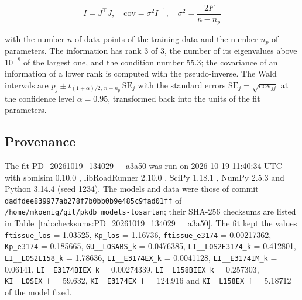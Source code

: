 \documentclass{article}
\begin{document}
\begin{equation}
I = J^\top J, \quad \mathrm{cov} = \sigma^2 I^{-1}, \quad \sigma^2 = \frac{2 F}{n - n_p}
\end{equation}

with the number $n$ of data points of the training data and the number $n_p$ of parameters. The information has rank 3 of 3, the number of its eigenvalues above $10^{-8}$ of the largest one, and the condition number 55.3; the covariance of an information of a lower rank is computed with the pseudo-inverse. The Wald intervals are $\hat{p}_j \pm t_{(1+\alpha)/2,\, n-n_p}\, \mathrm{SE}_j$ with the standard errors $\mathrm{SE}_j = \sqrt{\mathrm{cov}_{jj}}$ at the confidence level $\alpha = 0.95$, transformed back into the units of the fit parameters.

\subsection{Provenance}

The fit PD\_20261019\_134029\_\_a3a50 was run on 2026-10-19 11:40:34 UTC with sbmlsim 0.10.0 \cite{Koenig2026_sbmlsim}, libRoadRunner 2.10.0 \cite{Welsh2023}, SciPy 1.18.1 \cite{Virtanen2020}, NumPy 2.5.3 \cite{Harris2020} and Python 3.14.4 (seed 1234). The models and data were those of commit \texttt{dadfdee839977ab278f7b0bb0b9e485c9fad01ff} of \texttt{/home/mkoenig/git/pkdb\_models-losartan}; their SHA-256 checksums are listed in Table~\ref{tab:checksums:PD_20261019_134029__a3a50}. The fit kept the values \texttt{ftissue\_los} = 1.03525, \texttt{Kp\_los} = 1.16736, \texttt{ftissue\_e3174} = 0.00217362, \texttt{Kp\_e3174} = 0.185665, \texttt{GU\_\_LOSABS\_k} = 0.0476385, \texttt{LI\_\_LOS2E3174\_k} = 0.412801, \texttt{LI\_\_LOS2L158\_k} = 1.78636, \texttt{LI\_\_E3174EX\_k} = 0.0041128, \texttt{LI\_\_E3174IM\_k} = 0.06141, \texttt{LI\_\_E3174BIEX\_k} = 0.00274339, \texttt{LI\_\_L158BIEX\_k} = 0.257303, \texttt{KI\_\_LOSEX\_f} = 59.632, \texttt{KI\_\_E3174EX\_f} = 124.916 and \texttt{KI\_\_L158EX\_f} = 5.18712 of the model fixed.
\end{document}
